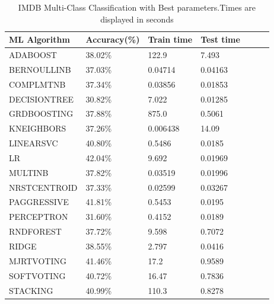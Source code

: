 \documentclass[conference]{IEEEtran}
\begin{document}
\begin{table}[]
\caption{IMDB Multi-Class Classification with Best parameters.Times are displayed in seconds}
\label{table:imdb_multi_best}
\begin{center}
\begin{adjustbox}{max width=0.99\textwidth}
\begin{tabular}{|l|l|l|l|l|l|l|}
\hline
ML Algorithm                    & Accuracy(\%) & Train time  & Test time  \\
\hline
 ADABOOST           & 38.02\%                & 122.9                   & 7.493               \\
BERNOULLINB                   & 37.03\%               & 0.04714                 & 0.04163             \\
 COMPLMTNB                  & 37.34\%               & 0.03856                 & 0.01853             \\
 DECISIONTREE      & 30.82\%               & 7.022                   & 0.01285             \\
 GRDBOOSTING  & 37.88\%                & 875.0                   & 0.5061              \\
KNEIGHBORS        & 37.26\%               & 0.006438                & 14.09               \\
 LINEARSVC                     & 40.80\%                & 0.5486                  & 0.0185              \\
 LR            & 42.04\%                & 9.692                   & 0.01969             \\
 MULTINB                 & 37.82\%               & 0.03519                 & 0.01996 \\
 NRSTCENTROID               & 37.33\%                & 0.02599                 & 0.03267             \\
 PAGGRESSIVE & 41.81\%                & 0.5453                  & 0.0195      \\
 PERCEPTRON                      & 31.60\%              & 0.4152                  & 0.0189              \\
 RNDFOREST      & 37.72\%                & 9.598                   & 0.7072              \\
RIDGE                & 38.55\%                & 2.797                   & 0.0416              \\
MJRTVOTING & 41.46\%
& 17.2                    & 0.9589 
\\
SOFTVOTING        & 40.72\%               & 16.47                   & 0.7836              \\
 STACKING            & 40.99\%                & 110.3                   & 0.8278             \\
\hline
\end{tabular}
\end{adjustbox}
\end{center}
\end{table}
\end{document}
